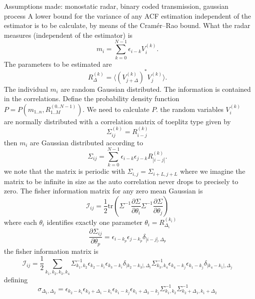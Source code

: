 \documentclass[18pt,a4paper]{extarticle}
\begin{document}
Assumptions made: monostatic radar, binary coded transmission, gaussian process
A lower bound for the variance of any ACF estimation independent of the estimator is to be calculate, by means of the Cramér–Rao bound.
What the radar measures (independent of the estimator) is
\begin{equation}
m_i=\sum_{k=0}^{N-1} \epsilon_{i-k} V^{(k)}_i.
\end{equation}
The parameters to be estimated are 
\begin{equation}
R^{(k)}_\Delta=\langle (V_{j+\Delta}^{(k)})^* V_j^{(k)} \rangle.
\end{equation}
The individual $m_i$ are random Gaussian distributed.
The information is contained in the correlations.
Define the probability density function $P = P(m_{1..n}, R^{(0..N-1)}_{1..M})$.
We need to calculate $P$.
the random variables $V^{(k)}_i$ are normally distributed with a correlation matrix of toeplitz type given by
\begin{equation}
\Sigma^{(k)}_{ij} = R_{i-j}^{(k)}
\end{equation}
then $m_i$ are Gaussian distributed according to
\begin{equation}
\Sigma_{ij} = \sum_{k=0}^{N-1} \epsilon_{i-k} \epsilon_{j-k} R_{|i-j|}^{(k)}.
\end{equation}
we note that the matrix is periodic with $\Sigma_{i,j} = \Sigma_{i+L,j+L}$
where we imagine the matrix to be infinite in size as the auto correlation never drops to precisely to zero.
The fisher information matrix for any zero mean Gaussian is
\begin{equation}
\mathcal{I}_{ij} = \frac{1}{2}\mathrm{tr}\left(\Sigma^{-1} \frac{\partial \Sigma}{\partial \theta_i} \Sigma^{-1} \frac{\partial \Sigma}{\partial \theta_j} \right)
\end{equation}
where each $\theta_i$ identifies exactly one parameter $\theta_i = R^{(k_i)}_{\Delta_i}$
\begin{equation}
\frac{\partial \Sigma_{ij}}{\partial \theta_p} = \epsilon_{i - k_p}\epsilon_{j - k_p}\delta_{|i-j|,\Delta_p}
\end{equation}
the fisher information matrix is
\begin{equation}
\mathcal{I}_{ij} = \frac{1}{2}\sum_{k_1, k_2, k_3, k_4}
\Sigma^{-1}_{k_1, k_2}
\epsilon_{k_2 - k_i}\epsilon_{k_3 - k_i}\delta_{|k_2-k_3|,\Delta_i}
\Sigma^{-1}_{k_3, k_4}
\epsilon_{k_4 - k_j}\epsilon_{k_1 - k_j}\delta_{|k_4-k_1|,\Delta_j}
\end{equation}
defining
\begin{equation}
\sigma_{\Delta_1, \Delta_2} =
\epsilon_{k_2 - k_i}\epsilon_{k_2 + \Delta_1 - k_i}
\epsilon_{k_1 - k_j}\epsilon_{k_1 + \Delta_2 - k_j}
\Sigma^{-1}_{k_1, k_2}
\Sigma^{-1}_{k_2 + \Delta_1, k_1 + \Delta_2}
\end{equation}
\end{document}
